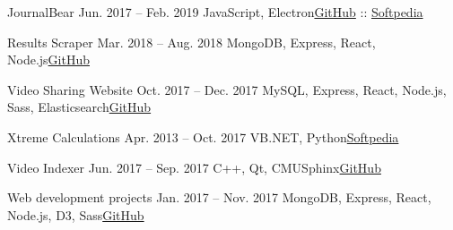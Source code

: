     \ifdesktop
    \resumeSubheading
      {JournalBear \python}{Jun. 2017 -- Feb. 2019}
      {JavaScript, Electron}{\href{https://github.com/yrahul3910/journal}{GitHub}  :: \href{https://www.softpedia.com/get/Office-tools/Diary-Organizers-Calendar/JournalBear.shtml}{Softpedia}}
    \fi
    
    \ifwebdev
    \resumeSubheading
      {Results Scraper \javascript}{Mar. 2018 -- Aug. 2018}
      {MongoDB, Express, React, Node.js}{\href{https://github.com/yrahul3910/results-scraper-node}{GitHub}}
    \fi
      
    \ifwebdev
    \resumeSubheading
      {Video Sharing Website \javascript}{Oct. 2017 -- Dec. 2017}
      {MySQL, Express, React, Node.js, Sass, Elasticsearch}{\href{https://github.com/yrahul3910/video-sharing-site}{GitHub}}
    \fi
      
    \ifdesktop
    \resumeSubheading
      {Xtreme Calculations \vbnet}{Apr. 2013 -- Oct. 2017}
      {VB.NET, Python}{\href{https://www.softpedia.com/get/Science-CAD/Xtreme-Calculations.shtml}{Softpedia}}
    \fi
      
    \ifdesktop
    \resumeSubheading
      {Video Indexer \cpp}{Jun. 2017 -- Sep. 2017}
      {C++, Qt, CMUSphinx}{\href{https://github.com/yrahul3910/video-indexer}{GitHub}}
    \fi
      
    \ifwebdev
    \resumeSubheading
      {Web development projects \javascript}{Jan. 2017 -- Nov. 2017}
      {MongoDB, Express, React, Node.js, D3, Sass}{\href{https://github.com/yrahul3910/video-indexer}{GitHub}}
    \fi
  \resumeSubHeadingListEnd